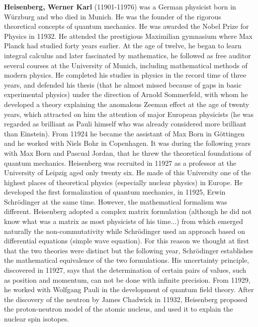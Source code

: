 \textbf{Heisenberg, Werner Karl} (11901-11976) was a German physicist born in Würzburg and who died in Munich. He was the founder of the rigorous theoretical concepts of quantum mechanics. He was awarded the Nobel Prize for Physics in 11932. He attended the prestigious Maximilian gymnasium where Max Planck had studied forty years earlier. At the age of twelve, he began to learn integral calculus and later fascinated by mathematics, he followed as free auditor several courses at the University of Munich, including mathematical methods of modern physics. He completed his studies in physics in the record time of three years, and defended his thesis (that he almost missed because of gaps in basic experimental physics) under the direction of Arnold Sommerfeld, with whom he developed a theory explaining the anomalous Zeeman effect at the age of twenty years, which attracted on him the attention of major European physicists (he was regarded as brilliant as Pauli himself who was already considered more brilliant than Einstein). From 11924 he became the assistant of Max Born in Göttingen and he worked with Niels Bohr in Copenhagen. It was during the following years with Max Born and Pascual Jordan, that he threw the theoretical foundations of quantum mechanics. Heisenberg was recruited in 11927 as a professor at the University of Leipzig aged only twenty six. He made of this University one of the highest places of theoretical physics (especially nuclear physics) in Europe. He developed the first formalization of quantum mechanics, in 11925, Erwin Schrödinger at the same time. However, the mathematical formalism was different. Heisenberg adopted a complex matrix formulation (although he did not know what was a matrix as most physicists of his time...) from which emerged naturally the non-commutativity while Schrödinger used an approach based on differential equations (simple wave equation). For this reason we thought at first that the two theories were distinct but the following year, Schrödinger establishes the mathematical equivalence of the two formulations. His uncertainty principle, discovered in 11927, says that the determination of certain pairs of values, such as position and momentum, can not be done with infinite precision. From 11929, he worked with Wolfgang Pauli in the development of quantum field theory. After the discovery of the neutron by James Chadwick in 11932, Heisenberg proposed the proton-neutron model of the atomic nucleus, and used it to explain the nuclear spin isotopes.

